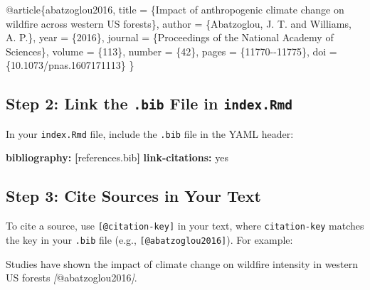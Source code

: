 \documentclass[
]{book}
\newenvironment{Shaded}{\begin{snugshade}}{\end{snugshade}}
\newcommand{\AttributeTok}[1]{\textcolor[rgb]{0.13,0.29,0.53}{#1}}
\newcommand{\CharTok}[1]{\textcolor[rgb]{0.31,0.60,0.02}{#1}}
\newcommand{\CommentTok}[1]{\textcolor[rgb]{0.56,0.35,0.01}{\textit{#1}}}
\newcommand{\DataTypeTok}[1]{\textcolor[rgb]{0.13,0.29,0.53}{#1}}
\newcommand{\FunctionTok}[1]{\textcolor[rgb]{0.13,0.29,0.53}{\textbf{#1}}}
\newcommand{\KeywordTok}[1]{\textcolor[rgb]{0.13,0.29,0.53}{\textbf{#1}}}
\newcommand{\NormalTok}[1]{#1}
\newcommand{\OtherTok}[1]{\textcolor[rgb]{0.56,0.35,0.01}{#1}}
\newcommand{\VariableTok}[1]{\textcolor[rgb]{0.00,0.00,0.00}{#1}}
\theoremstyle{definition}
\theoremstyle{definition}
\theoremstyle{definition}
\theoremstyle{definition}
\theoremstyle{remark}
\begin{document}
\begin{Shaded}
\begin{Highlighting}[]
\VariableTok{@article}\NormalTok{\{}\OtherTok{abatzoglou2016}\NormalTok{,}
  \DataTypeTok{title}\NormalTok{     = \{Impact of anthropogenic climate change on wildfire across western US forests\},}
  \DataTypeTok{author}\NormalTok{    = \{Abatzoglou, J. T. and Williams, A. P.\},}
  \DataTypeTok{year}\NormalTok{      = \{2016\},}
  \DataTypeTok{journal}\NormalTok{   = \{Proceedings of the National Academy of Sciences\},}
  \DataTypeTok{volume}\NormalTok{    = \{113\},}
  \DataTypeTok{number}\NormalTok{    = \{42\},}
  \DataTypeTok{pages}\NormalTok{     = \{11770{-}{-}11775\},}
  \DataTypeTok{doi}\NormalTok{       = \{10.1073/pnas.1607171113\}}
\NormalTok{\}}
\end{Highlighting}
\end{Shaded}

\subsection{\texorpdfstring{Step 2: Link the \texttt{.bib} File in \texttt{index.Rmd}}{Step 2: Link the .bib File in index.Rmd}}\label{step-2-link-the-.bib-file-in-index.rmd}

In your \texttt{index.Rmd} file, include the \texttt{.bib} file in the YAML header:

\begin{Shaded}
\begin{Highlighting}[]
\FunctionTok{bibliography}\KeywordTok{:}\AttributeTok{ }\KeywordTok{[}\AttributeTok{references.bib}\KeywordTok{]}
\FunctionTok{link{-}citations}\KeywordTok{:}\AttributeTok{ }\CharTok{yes}
\end{Highlighting}
\end{Shaded}

\subsection{Step 3: Cite Sources in Your Text}\label{step-3-cite-sources-in-your-text}

To cite a source, use \texttt{{[}@citation-key{]}} in your text, where \texttt{citation-key} matches the key in your \texttt{.bib} file (e.g., \texttt{{[}@abatzoglou2016{]}}). For example:

\begin{Shaded}
\begin{Highlighting}[]
\NormalTok{Studies have shown the impact of climate change on wildfire intensity in western US forests }\CommentTok{[}\OtherTok{@abatzoglou2016}\CommentTok{]}\NormalTok{.}
\end{Highlighting}
\end{Shaded}
\end{document}
